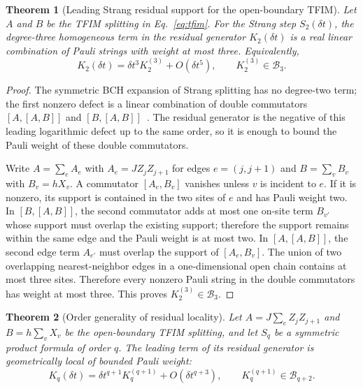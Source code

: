 \documentclass[aps,prresearch,reprint,superscriptaddress,nofootinbib,amsmath,amssymb]{revtex4-2}
\newcommand{\tfim}{TFIM}
\newcommand{\cB}{\mathcal{B}}
\newcommand{\dt}{\delta t}
\newtheorem{theorem}{Theorem}
\begin{document}
\begin{theorem}[Leading Strang residual support for the open-boundary TFIM]
\label{thm:tfim-support}
Let $A$ and $B$ be the \tfim{} splitting in Eq.~\eqref{eq:tfim}. For the Strang step $S_2(\dt)$, the degree-three homogeneous term in the residual generator $K_2(\dt)$ is a real linear combination of Pauli strings with weight at most three. Equivalently,
\begin{equation}
    K_2(\dt)=\dt^3K_2^{(3)}+O(\dt^5),
    \qquad
    K_2^{(3)}\in\cB_3.
\end{equation}
\end{theorem}

\begin{proof}
The symmetric BCH expansion of Strang splitting has no degree-two term; the first nonzero defect is a linear combination of double commutators $[A,[A,B]]$ and $[B,[A,B]]$~\cite{magnus1954,blanes2009}. The residual generator is the negative of this leading logarithmic defect up to the same order, so it is enough to bound the Pauli weight of these double commutators.

Write $A=\sum_e A_e$ with $A_e=JZ_jZ_{j+1}$ for edges $e=(j,j+1)$ and $B=\sum_v B_v$ with $B_v=hX_v$. A commutator $[A_e,B_v]$ vanishes unless $v$ is incident to $e$. If it is nonzero, its support is contained in the two sites of $e$ and has Pauli weight two. In $[B,[A,B]]$, the second commutator adds at most one on-site term $B_{v'}$ whose support must overlap the existing support; therefore the support remains within the same edge and the Pauli weight is at most two. In $[A,[A,B]]$, the second edge term $A_{e'}$ must overlap the support of $[A_e,B_v]$. The union of two overlapping nearest-neighbor edges in a one-dimensional open chain contains at most three sites. Therefore every nonzero Pauli string in the double commutators has weight at most three. This proves $K_2^{(3)}\in\cB_3$.
\end{proof}

\begin{theorem}[Order generality of residual locality]
\label{thm:order-locality}
Let $A=J\sum_e Z_jZ_{j+1}$ and $B=h\sum_v X_v$ be the open-boundary \tfim{} splitting, and let $S_q$ be a symmetric product formula of order $q$. The leading term of its residual generator is geometrically local of bounded Pauli weight:
\begin{equation}
    K_q(\dt)=\dt^{q+1}K_q^{(q+1)}+O(\dt^{q+3}),
    \qquad
    K_q^{(q+1)}\in\cB_{q+2}.
\end{equation}
\end{theorem}
\end{document}
